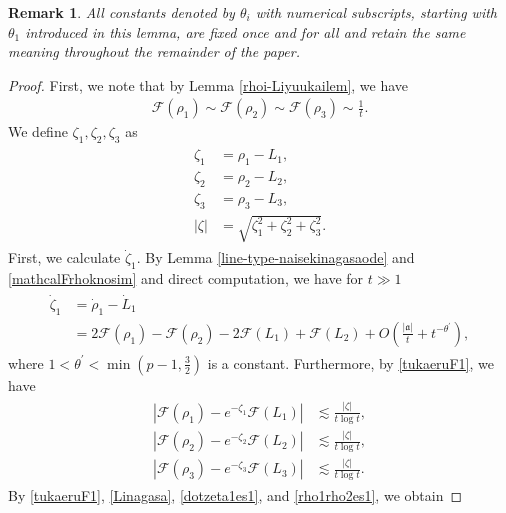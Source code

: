 \documentclass[10pt,a4paper]{amsart}
\newtheorem{remark}{Remark}[section]
\numberwithin{equation}{section}
\begin{document}
\begin{remark}
All constants denoted by $\theta_i$ with numerical subscripts, starting with $\theta_1$ introduced in this lemma, are fixed once and for all and retain the same meaning throughout the remainder of the paper.
\end{remark}



\begin{proof}
First, we note that by Lemma \ref{rhoi-Liyuukailem}, we have
\begin{align}\label{mathcalFrhoknosim}
\mathcal{F}(\rho_1)\sim \mathcal{F}(\rho_2)\sim \mathcal{F}(\rho_3)\sim \frac{1}{t}.
\end{align}
We define $\zeta_1,\zeta_2,\zeta_3$ as 
\begin{align}\label{zetaidef}
\begin{aligned}
\zeta_1&=\rho_1-L_1,
\\
\zeta_2&=\rho_2-L_2,
\\
\zeta_3&=\rho_3-L_3,
\\
|\zeta|&=\sqrt{\zeta_1^2+\zeta_2^2+\zeta_3^2}.
\end{aligned}
\end{align}
First, we calculate $\dot{\zeta}_1$. By Lemma \ref{line-type-naisekinagasaode} and \eqref{mathcalFrhoknosim} and direct computation, we have for $t\gg 1$
\begin{align}\label{dotzeta1es1}
\begin{aligned}
\dot{\zeta}_1&=\dot{\rho}_1-\dot{L}_1
\\
&=2\mathcal{F}(\rho_1)-\mathcal{F}(\rho_2)-2\mathcal{F}(L_1)+\mathcal{F}(L_2)+O\left(\frac{|\mathfrak{a}|}{t}+t^{-\theta^{\prime}}\right),
\end{aligned}
\end{align}
where $1<\theta^{\prime}<\min{(p-1,\frac{3}{2})}$ is a constant. Furthermore, by \eqref{tukaeruF1}, we have
\begin{align}\label{rho1rho2es1}
\begin{aligned}
\left|\mathcal{F}(\rho_1)-e^{-\zeta_1}\mathcal{F}(L_1)\right|&\lesssim \frac{|\zeta|}{t\log{t}},
\\
\left|\mathcal{F}(\rho_2)-e^{-\zeta_2}\mathcal{F}(L_2)\right|&\lesssim \frac{|\zeta|}{t\log{t}},
\\
\left|\mathcal{F}(\rho_3)-e^{-\zeta_3}\mathcal{F}(L_3)\right|&\lesssim \frac{|\zeta|}{t\log{t}}.
\end{aligned}
\end{align}
By \eqref{tukaeruF1}, \eqref{Linagasa}, \eqref{dotzeta1es1}, and \eqref{rho1rho2es1}, we obtain

\end{proof}
\end{document}
